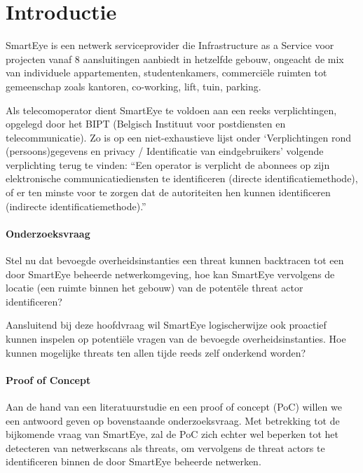 
\section{Introductie}%
\label{sec:introductie}
SmartEye is een netwerk serviceprovider die Infrastructure as a Service voor projecten vanaf 8 aansluitingen aanbiedt in hetzelfde gebouw, ongeacht de mix van individuele appartementen, studentenkamers, commerciële ruimten tot gemeenschap zoals kantoren, co-working, lift, tuin, parking.~\autocite{Smarteye2021}

Als telecomoperator dient SmartEye te voldoen aan een reeks verplichtingen, opgelegd door het BIPT (Belgisch Instituut voor postdiensten en telecommunicatie). Zo is op een niet-exhaustieve lijst onder ‘Verplichtingen rond (persoons)\-gegevens en privacy / Identificatie van eindgebruikers’ volgende verplichting terug te vinden: “Een operator is verplicht de abonnees op zijn elektronische communicatiediensten te identificeren (directe identificatiemethode),\\of er ten minste voor te zorgen dat de autoriteiten hen kunnen identificeren (indirecte identificatiemethode).”~\autocite{BIPT2023}

\paragraph{Onderzoeksvraag}
Stel nu dat bevoegde overheidsinstanties een threat kunnen backtracen tot een door SmartEye beheerde netwerkomgeving, hoe kan SmartEye vervolgens de locatie (een ruimte binnen het gebouw) van de potentële threat actor identificeren?

Aansluitend bij deze hoofdvraag wil SmartEye logischerwijze ook proactief kunnen inspelen op potentiële vragen van de bevoegde overheidsinstanties. Hoe kunnen mogelijke threats ten allen tijde reeds zelf onderkend worden?

\paragraph{Proof of Concept}
Aan de hand van een literatuurstudie en een proof of concept (PoC) willen we een antwoord geven op bovenstaande onderzoeksvraag. Met betrekking tot de bijkomende vraag van Smart\-Eye, zal de PoC zich echter wel beperken tot het detecteren van netwerkscans als threats, om vervolgens de threat actors te identificeren binnen de door SmartEye beheerde netwerken.

